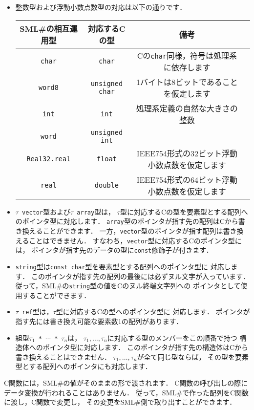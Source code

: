 \documentclass{jbook}
\newcommand{\smlsharp}{SML\#}
\begin{document}
\begin{itemize}
\item 整数型および浮動小数点数型の対応は以下の通りです．
\begin{center}
\begin{tabular}{|c|c|c|l|}
\hline
\smlsharp{}の相互運用型 & 対応するCの型 & 備考\\
\hline
{\tt char} & {\tt char} & Cの{\tt char}同様，符号は処理系に依存します\\
{\tt word8} & {\tt unsigned char} & 1バイトは8ビットであることを仮定します\\
{\tt int} & {\tt int} & 処理系定義の自然な大きさの整数\\
{\tt word} & {\tt unsigned int} &\\
{\tt Real32.real} & {\tt float} & IEEE754形式の32ビット浮動小数点数を仮定します\\
{\tt real} & {\tt double} & IEEE754形式の64ビット浮動小数点数を仮定します\\
\hline
\end{tabular}
\end{center}
\item
	{\tt $\tau$ vector}型および{\tt $\tau$ array}型は，
$\tau$型に対応するCの型を要素型とする配列へのポインタ型に対応します．
	{\tt array}型のポインタが指す先の配列はCから書き換えることができます．
	一方，{\tt vector}型のポインタが指す配列は書き換えることはできません．
	すなわち，{\tt vector}型に対応するCのポインタ型には，
ポインタが指す先のデータの型に{\tt const}修飾子が付きます．
\item
	{\tt string}型は{\tt const char}型を要素型とする配列へのポインタ型に
対応します．
	このポインタが指す先の配列の最後には必ずヌル文字が入っています．
	従って，\smlsharp{}の{\tt string}型の値をCのヌル終端文字列への
ポインタとして使用することができます．
\item
	{\tt $\tau$ ref}型は，$\tau$型に対応するCの型へのポインタ型に
対応します．
	ポインタが指す先には書き換え可能な要素数1の配列があります．
\item
	組型{\tt $\tau_1$ * $\cdots$ * $\tau_n$}は，
$\tau_1,\ldots,\tau_n$に対応する型のメンバーをこの順番で持つ
構造体へのポインタ型に対応します．
	このポインタが指す先の構造体はCから書き換えることはできません．
        $\tau_1,\ldots,\tau_n$が全て同じ型ならば，
その型を要素型とする配列へのポインタにも対応します．
\end{itemize}
	C関数には，\smlsharp{}の値がそのままの形で渡されます．
	C関数の呼び出しの際にデータ変換が行われることはありません．
	従って，\smlsharp{}で作った配列をC関数に渡し，C関数で変更し，
その変更を\smlsharp{}側で取り出すことができます．
\end{document}
